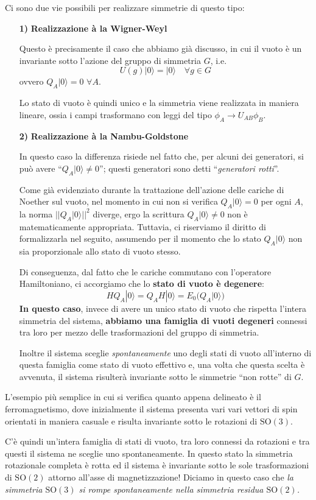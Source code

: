 \documentclass[../main.tex]{subfiles}
\begin{document}
Ci sono due vie possibili per realizzare simmetrie di questo tipo:
\begin{enumerate}
    \item[\textbf{1)}] \textbf{Realizzazione à la Wigner-Weyl}

    Questo è precisamente il caso che abbiamo già discusso, in cui il vuoto è un invariante sotto l'azione del gruppo di simmetria $G$, i.e.
    \[
    U(g)|0\rangle = |0\rangle \quad\forall g\in G
    \]
    ovvero $Q_A|0\rangle = 0$ $\forall A$.

    Lo stato di vuoto è quindi unico e la simmetria viene realizzata in maniera lineare, ossia i campi trasformano con leggi del tipo $\phi_A \rightarrow U_{AB}\phi_B$.
    
    \item[\textbf{2)}] \textbf{Realizzazione à la Nambu-Goldstone}
    
    In questo caso la differenza risiede nel fatto che, per alcuni dei generatori, si può avere “$Q_A|0\rangle \neq 0$”; questi generatori sono detti “\textit{generatori rotti}”. 

    Come già evidenziato durante la trattazione dell'azione delle cariche di Noether sul vuoto, nel momento in cui non si verifica $Q_A|0\rangle = 0$ per ogni $A$, la norma $||Q_A|0\rangle||^2$ diverge, ergo la scrittura $Q_A|0\rangle \neq 0$ non è matematicamente appropriata. Tuttavia, ci riserviamo il diritto di formalizzarla nel seguito, assumendo per il momento che lo stato $Q_A|0\rangle$ non sia proporzionale allo stato di vuoto stesso.

    Di conseguenza, dal fatto che le cariche commutano con l'operatore Hamiltoniano, ci accorgiamo che lo \textbf{stato di vuoto è degenere}:
    \[
    HQ_A|0\rangle = Q_AH|0\rangle = E_0\big(Q_A|0\rangle\big)
    \]
    \textbf{In questo caso}, invece di avere un unico stato di vuoto che rispetta l'intera simmetria del sistema, \textbf{abbiamo una famiglia di vuoti degeneri} connessi tra loro per mezzo delle trasformazioni del gruppo di simmetria.

    Inoltre il sistema sceglie \textit{spontaneamente} uno degli stati di vuoto all'interno di questa famiglia come stato di vuoto effettivo e, una volta che questa scelta è avvenuta, il sistema risulterà invariante sotto le simmetrie “non rotte” di $G$.
\end{enumerate}
\begin{example}
    L'esempio più semplice in cui si verifica quanto appena delineato è il ferromagnetismo, dove inizialmente il sistema presenta vari vari vettori di spin orientati in maniera casuale e risulta invariante sotto le rotazioni di $\textrm{SO}(3)$.

    C'è quindi un'intera famiglia di stati di vuoto, tra loro connessi da rotazioni e tra questi il sistema ne sceglie uno spontaneamente. In questo stato la simmetria rotazionale completa è rotta ed il sistema è invariante sotto le sole trasformazioni di $\textrm{SO}(2)$ attorno all'asse di magnetizzazione! Diciamo in questo caso che \textit{la simmetria $\textrm{SO}(3)$ si rompe spontaneamente nella simmetria residua $\textrm{SO}(2)$.}
\end{example}
\end{document}
